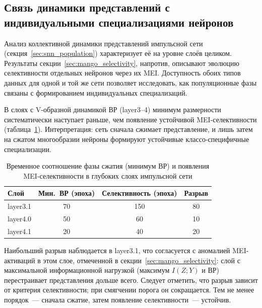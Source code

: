 
\subsection{Связь динамики представлений с индивидуальными специализациями нейронов}\label{sec:ib_mei}

Анализ коллективной динамики представлений импульсной сети (секция~\ref{sec:snn_population}) характеризует её на уровне слоёв целиком. Результаты секции~\ref{sec:mango_selectivity}, напротив, описывают эволюцию селективности отдельных нейронов через их MEI. Доступность обоих типов данных для одной и той же сети позволяет исследовать, как популяционные фазы связаны с формированием индивидуальных специализаций.

В слоях с V-образной динамикой ВР (layer3--4) минимум размерности систематически наступает раньше, чем появление устойчивой MEI-селективности (таблица~\ref{tab:ib_compression_vs_spec}). Интерпретация: сеть сначала сжимает представление, и лишь затем на сжатом многообразии нейроны формируют устойчивые классо-специфичные специализации.

\begin{table}[ht]
\centering
\caption{Временное соотношение фазы сжатия (минимум ВР) и появления MEI-селективности в глубоких слоях импульсной сети}
\label{tab:ib_compression_vs_spec}
\begin{tabular}{lccc}
\toprule
\textbf{Слой} & \textbf{Мин.~ВР (эпоха)} & \textbf{Селективность (эпоха)} & \textbf{Разрыв} \\
\midrule
layer3.1 & 70 & 150 & 80 \\
layer4.0 & 50 & 60 & 10 \\
layer4.1 & 20 & 40 & 20 \\
\bottomrule
\end{tabular}
\end{table}

Наибольший разрыв наблюдается в layer3.1, что согласуется с аномалией MEI-активаций в этом слое, отмеченной в секции~\ref{sec:mango_selectivity}: слой с максимальной информационной нагрузкой (максимум $I(Z; Y)$ и ВР) перестраивает представления дольше всего. Следует отметить, что разрыв зависит от критерия селективности; при смягчении порога он сокращается. Тем не менее порядок~--- сначала сжатие, затем появление селективности~--- устойчив.

